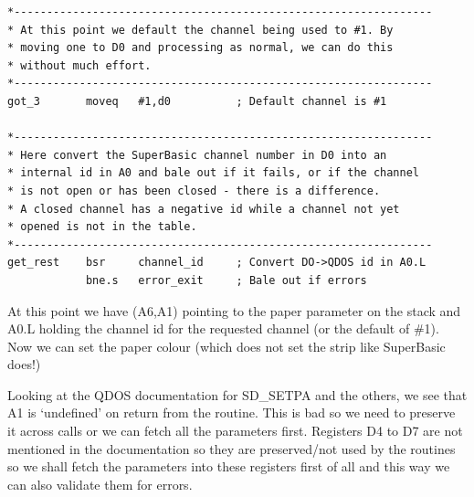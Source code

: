 \begin{lstlisting}[firstnumber=13,caption={PSI\_CLS - The Final Version - Part 1},label={lst:PsiClsFinalVersionPart1}]
*----------------------------------------------------------------
* At this point we default the channel being used to #1. By
* moving one to D0 and processing as normal, we can do this 
* without much effort.
*----------------------------------------------------------------
got_3       moveq   #1,d0          ; Default channel is #1

*----------------------------------------------------------------
* Here convert the SuperBasic channel number in D0 into an 
* internal id in A0 and bale out if it fails, or if the channel
* is not open or has been closed - there is a difference. 
* A closed channel has a negative id while a channel not yet 
* opened is not in the table.
*----------------------------------------------------------------
get_rest    bsr     channel_id     ; Convert DO->QDOS id in A0.L
            bne.s   error_exit     ; Bale out if errors
\end{lstlisting}

At this point we have (A6,A1) pointing to the paper parameter on the
    stack and A0.L holding the channel id for the requested channel (or the
    default of \#1). Now we can set the paper colour (which does not set the
    strip like SuperBasic does!)

Looking at the QDOS documentation for SD\_SETPA and the others, we
    see that A1 is `undefined' on return from the routine. This is bad so we
    need to preserve it across calls or we can fetch all the parameters first.
    Registers D4 to D7 are not mentioned in the documentation so they are
    preserved/not used by the routines so we shall fetch the parameters into
    these registers first of all and this way we can also validate them for
    errors.

